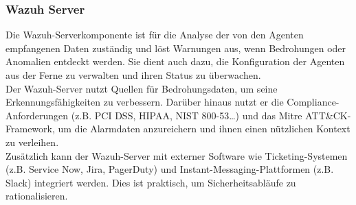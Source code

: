\subsubsection{Wazuh Server}
Die Wazuh-Serverkomponente ist für die Analyse der von den Agenten empfangenen Daten zuständig und löst Warnungen aus, wenn Bedrohungen oder Anomalien entdeckt werden.
Sie dient auch dazu, die Konfiguration der Agenten aus der Ferne zu verwalten und ihren Status zu überwachen.\\

Der Wazuh-Server nutzt Quellen für Bedrohungsdaten, um seine Erkennungsfähigkeiten zu verbessern.
Darüber hinaus nutzt er die Compliance-Anforderungen (z.B. PCI DSS, HIPAA, NIST 800-53\dots) und das Mitre ATT\&CK-Framework, um die Alarmdaten anzureichern und ihnen einen nützlichen Kontext zu verleihen.\\

Zusätzlich kann der Wazuh-Server mit externer Software wie Ticketing-Systemen (z.B. Service Now, Jira, PagerDuty) und Instant-Messaging-Plattformen (z.B. Slack) integriert werden. 
Dies ist praktisch, um Sicherheitsabläufe zu rationalisieren.